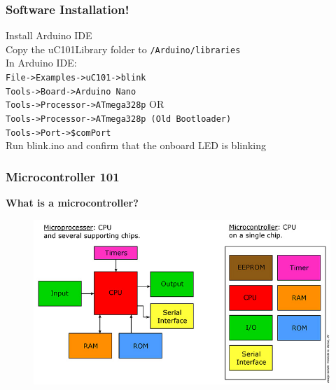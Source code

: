 \documentclass[t]{beamer}
\begin{document}


\begin{frame}[t]
\frametitle{Software Installation!}
Install Arduino  IDE\\
Copy the uC101Library folder to \texttt{/Arduino/libraries}\\
In Arduino IDE:\\
\texttt{File->Examples->uC101->blink}\\
\texttt{Tools->Board->Arduino Nano}\\
\texttt{Tools->Processor->ATmega328p} OR\\
\texttt{Tools->Processor->ATmega328p (Old Bootloader)}\\
\texttt{Tools->Port->\$comPort}\\
Run blink.ino and confirm that the onboard LED is blinking


\end{frame}

\begin{frame}[t]
\frametitle{Microcontroller 101}

\textbf{What is a microcontroller?} 

\begin{figure}
	\includegraphics[scale=0.4]{microProcessorVsController.jpg}
\end{figure}

\end{frame}

\end{document}
